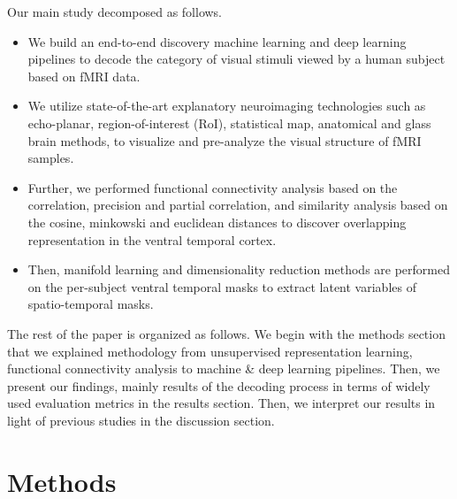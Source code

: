 \documentclass[10pt, twocolumn, letterpaper]{article}
\begin{document}
Our main study decomposed as follows.
\begin{itemize}[noitemsep]
    \item We build an end-to-end discovery machine learning and deep learning pipelines to decode the category of visual stimuli viewed by a human subject based on fMRI data. 
    
    \item We utilize state-of-the-art explanatory neuroimaging technologies such as echo-planar, region-of-interest (RoI), statistical map, anatomical and glass brain methods, to visualize and pre-analyze the visual structure of fMRI samples.
    
    \item Further, we performed functional connectivity analysis based on the correlation, precision and partial correlation, and similarity analysis based on the cosine, minkowski and euclidean distances to discover overlapping representation in the ventral temporal cortex.
    
    \item Then, manifold learning and dimensionality reduction methods are performed on the per-subject ventral temporal masks to extract latent variables of spatio-temporal masks.
\end{itemize}


The rest of the paper is organized as follows. We begin with the methods section that we explained methodology from unsupervised representation learning, functional connectivity analysis to machine \& deep learning pipelines. Then, we present our findings, mainly results of the decoding process in terms of widely used evaluation metrics in the results section. Then, we interpret our results in light of previous studies in the discussion section. 

\section{Methods}
\end{document}
